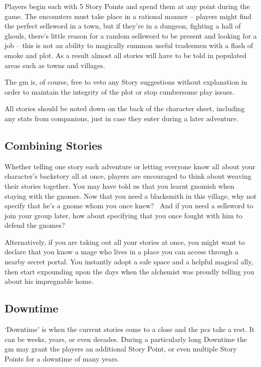 \begin{multicols}{2}

Players begin each with 5 Story Points and spend them at any point during the game. The encounters must take place in a rational manner -- players might find the perfect sellsword in a town, but if they're in a dungeon, fighting a hall of ghouls, there's little reason for a random sellsword to be present and looking for a job -- this is not an ability to magically summon useful tradesmen with a flash of smoke and plot. As a result almost all stories will have to be told in populated areas such as towns and villages.

The \gls{gm} is, of course, free to veto any Story suggestions without explanation in order to maintain the integrity of the plot or stop cumbersome play issues.

All stories should be noted down on the back of the character sheet, including any stats from companions, just in case they enter during a later adventure.

\subsection{Combining Stories}

Whether telling one story each adventure or letting everyone know all about your character's backstory all at once, players are encouraged to think about weaving their stories together. You may have told us that you learnt gnomish when staying with the gnomes. Now that you need a blacksmith in this village, why not specify that he's a gnome whom you once knew? \ And if you need a sellsword to join your group later, how about specifying that you once fought with him to defend the gnomes?

Alternatively, if you are taking out all your stories at once, you might want to declare that you know a mage who lives in a place you can access through a nearby secret portal. You instantly adopt a safe space and a helpful magical ally, then start expounding upon the days when the alchemist was proudly telling you about his impregnable home.

\subsection{Downtime}

`Downtime' is when the current stories come to a close and the \glspl{pc} take a rest.
It can be weeks, years, or even decades.
During a particularly long Downtime the \gls{gm} may grant the players an additional Story Point, or even multiple Story Points for a downtime of many years.


\end{multicols}
